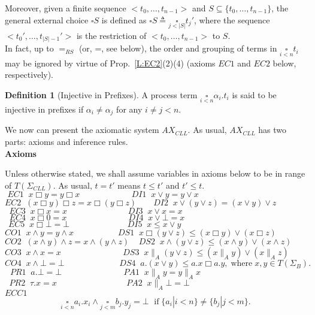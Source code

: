 \documentclass{elsarticle}
\theoremstyle{plain}
\theoremstyle{definition}
\newtheorem{mydefn}[theorem]{Definition}
\begin{document}
Moreover, given a finite sequence $<t_0,\dots,t_{n-1}>$ and $S \subseteq \{t_0,\dots,t_{n-1}\}$, the general external choice $\square S$ is defined as $\square S \triangleq \underset{j<|S|}\square t_j'$, where the sequence $<t_0',\dots,t_{|S|-1}'>$ is the restriction of $<t_0,\dots,t_{n-1}>$ to $S$.\\

In fact, up to $=_{RS}$ (or, =, see below), the order and grouping of terms in $\underset{i<n}{\square}t_i$ may be ignored by virtue of Prop.~\ref{L:EC2}(2)(4) (axioms $EC1$ and $EC2$ below, respectively).

\begin{mydefn}[Injective in Prefixes]
  A process term $\underset{i<n}{\square}\alpha_i.t_i$ is said to be injective in prefixes if $\alpha_i \neq \alpha_j$ for any $i \neq j < n$.
\end{mydefn}

We now can present the axiomatic system $AX_{CLL}$. As usual, $AX_{CLL}$ has two parts: axioms and inference rules.\\

\noindent \textbf{Axioms}

 Unless otherwise stated, we shall assume variables in axioms below to be in range of $T(\Sigma_{CLL})$. As usual, $t=t'$ means $t\leqslant t'$ and $t'\leqslant t$.\\

\noindent  \[  EC1   \;\;   x \Box y  = y \Box x \qquad\qquad\qquad\,
   DI1   \;\;     x \vee y  = y \vee x \qquad\qquad\qquad\qquad\qquad\qquad\;\;\]
  \[  EC2   \;\;   (x \Box y)\Box z  = x \Box (y \Box z) \qquad
   DI2   \;\;    x \vee (y \vee z ) = (x\vee y) \vee z \qquad\qquad\qquad\qquad\]
  \[  EC3   \;\;   x \Box x  = x \qquad\qquad\qquad\;\;\;\;\,
   DI3  \;\;     x \vee x  = x \qquad\qquad\qquad\qquad\qquad\qquad\qquad\;\]
  \[  EC4   \;\;   x \Box 0  = x \qquad\qquad\qquad\;\;\;\;\;
   DI4   \;\;     x \vee \bot  = x \qquad\qquad\qquad\qquad\qquad\qquad\qquad\]
  \[  EC5   \;\;   x \Box  \bot = \bot \qquad\qquad\qquad\;\;\;\mspace{1mu}
   DI5  \;\;     x  \leqslant x \vee y    \qquad\qquad\qquad\qquad\qquad\qquad\qquad\;\;\]
  \[  CO1   \;\;   x\wedge y  = y \wedge x \qquad\qquad\;\;\;\;\,
   DS1  \;\;     x \Box (y\vee z)  \leqslant (x \Box y) \vee (x \Box z)   \qquad\qquad\qquad\; \]
  \[  CO2   \;\;   (x\wedge y)\wedge z  = x \wedge (y \wedge z) \;\;\;\;
   DS2  \;\;     x \wedge (y\vee z)  \leqslant (x \wedge y) \vee (x \wedge z)  \qquad\qquad\qquad   \]
  \[  CO3   \;\;   x\wedge x  = x \qquad\qquad\qquad\;\;\;\;\;
   DS3  \;\;     x \parallel_A (y\vee z)  \leqslant (x \parallel_A y) \vee (x \parallel_A z)  \qquad\qquad\qquad    \]
  \[  CO4   \;\;   x\wedge \bot  = \bot \qquad\qquad\qquad\;\;
   DS4  \;\;     a.(x \vee y)  \leqslant a.x\Box a.y, \;\text{where}\;  x,y \in T(\Sigma_B).\;  \]
  \[ PR1  \;\;    a.\bot  = \bot  \qquad\qquad\qquad\;\;\;\;\;
   PA1   \;\;    x \parallel_A y  =y \parallel_A x \qquad\qquad\qquad\qquad\qquad\qquad\]
  \[ PR2  \;\;    \tau.x  = x  \qquad\qquad\qquad\;\;\;\;\;\;\:\:\:
   PA2  \;\;     x \parallel_A \bot  = \bot \qquad\qquad\qquad\qquad\qquad\qquad\;\;\;\;\;\]
  \noindent $ECC1$
   \[\underset{i< n}{\square}a_i.x_i\wedge \underset{j< m}{\square}b_j.y_j  = \bot \;\text{ if}\; \{a_i|i< n\}\neq \{b_j|j < m\}.\]
\end{document}
